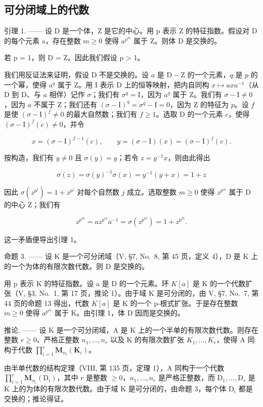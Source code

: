 \subsection{可分闭域上的代数}

引理 1. —— 设 D 是一个体，Z 是它的中心。用 p 表示 Z 的特征指数。假设对 D 的每个元素 a，存在整数 \(m \geqslant 0\) 使得 \(a^{p^{m}}\) 属于 Z。则体 D 是交换的。

若 p = 1，则 D = Z。因此我们假设 p \textgreater{} 1。

我们用反证法来证明，假设 D 不是交换的。设 \(a\) 是 \(\mathrm{D} - \mathrm{Z}\) 的一个元素，\(q\) 是 \(p\) 的一个幂，使得 \(a^q\) 属于 Z。用 I 表示 D 上的恒等映射，把内自同构 \(x \mapsto axa^{-1}\)（从 D 到 D、与 \(a\) 相伴）记作 \(\sigma\)；我们有 \(\sigma^q = \mathrm{I}\)，因为 \(a^q\) 属于 Z。我们有 \(\sigma - \mathrm{I} \neq 0\)，因为 \(a\) 不属于 Z；我们还有 \((\sigma - \mathrm{I})^q = \sigma^q - \mathrm{I} = 0\)，因为 Z 的特征为 \(p\)。设 \(f\) 是使 \((\sigma - \mathrm{I})^f \neq 0\) 的最大自然数；我们有 \(f \geqslant 1\)。选取 D 的一个元素 \(c\)，使得 \((\sigma - \mathrm{I})^f(c) \neq 0\)，并令

\[
x = (\sigma - \mathrm{I}) ^ {f - 1} (c), \qquad y = (\sigma - \mathrm{I}) (x) = (\sigma - \mathrm{I}) ^ {f} (c).
\]

按构造，我们有 \(y \neq 0\) 且 \(\sigma(y) = y\)；若令 \(z = y^{-1}x\)，则由此得出

\[
\sigma (z) = \sigma (y) ^ {- 1} \sigma (x) = y ^ {- 1} (y + x) = 1 + z
\]

因此 \(\sigma(z^{p^j}) = 1 + z^{p^j}\) 对每个自然数 \(j\) 成立。选取整数 \(m \geqslant 0\) 使得 \(z^{p^m}\) 属于 D 的中心 Z；我们有

\[
z ^ {p ^ {m}} = a z ^ {p ^ {m}} a ^ {- 1} = \sigma (z ^ {p ^ {m}}) = 1 + z ^ {p ^ {m}}.
\]

这一矛盾便导出引理 1。

命题 3. —— 设 K 是一个可分闭域（V, §7, No.~8, 第 45 页，定义 4），D 是 K 上的一个为体的有限次数代数。则 D 是交换的。

用 p 表示 K 的特征指数。设 a 是 D 的一个元素。环 \(K[a]\) 是 K 的一个代数扩张（V, §3, No.~1, 第 17 页，推论 1）。由于域 K 是可分闭的，由 V, §7, No.~7, 第 44 页的命题 13 得出，代数 \(K[a]\) 是 K 的一个 p-根式扩张。于是存在整数 \(m \geqslant 0\) 使得 \(a^{p^{m}}\) 属于 K。由引理 1，体 D 因而是交换的。

推论. —— 设 K 是一个可分闭域，A 是 K 上的一个半单的有限次数代数。则存在整数 \(r \geqslant 0\)、严格正整数 \(n_{1}, \ldots, n_{r}\) 以及 K 的有限次数扩张 \(K_{1}, \ldots, K_{r}\)，使得 A 同构于代数 \(\prod_{i=1}^{r} \mathbf{M}_{n_{i}}(\mathbf{K}_{i})\)。

由半单代数的结构定理（VIII, 第 135 页，定理 1），A 同构于一个代数 \(\prod_{i=1}^{r} \mathbf{M}_{n_i}(\mathrm{D}_i)\)，其中 \(r\) 是整数 \(\geqslant 0\)，\(n_1, \ldots, n_r\) 是严格正整数，而 \(\mathrm{D}_1, \ldots, \mathrm{D}_r\) 是 K 上的为体的有限次数代数。由于域 K 是可分闭的，由命题 3，每个体 \(\mathrm{D}_i\) 都是交换的；推论得证。

